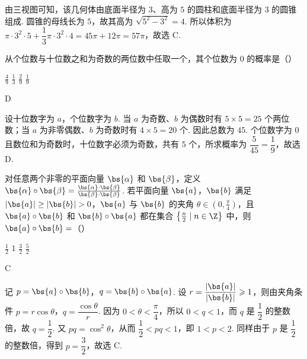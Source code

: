 \begin{solution}
由三视图可知，该几何体由底面半径为 \(3\)、高为 \(5\) 的圆柱和底面半径为 \(3\) 的圆锥组成. 圆锥的母线长为 \(5\)，故其高为 \(\sqrt{5^2-3^2}=4\). 所以体积为
\(\pi\cdot3^2\cdot5+\dfrac{1}{3}\pi\cdot3^2\cdot4=45\pi+12\pi=57\pi\)，故选 C.
\end{solution}

\begin{problem}
从个位数与十位数之和为奇数的两位数中任取一个，其个位数为 \(0\) 的概率是（\quad）

\choices
    {\(\frac{4}{9}\)}
    {\(\frac{1}{3}\)}
    {\(\frac{2}{9}\)}
    {\(\frac{1}{9}\)}
\end{problem}

\begin{answer}
D
\end{answer}

\begin{solution}
设十位数字为 \(a\)，个位数字为 \(b\). 当 \(a\) 为奇数、\(b\) 为偶数时有 \(5\times5=25\) 个两位数；当 \(a\) 为非零偶数、\(b\) 为奇数时有 \(4\times5=20\) 个. 因此总数为 \(45\). 个位数字为 \(0\) 且数位和为奇数时，十位数字必须为奇数，共有 \(5\) 个，所求概率为 \(\dfrac{5}{45}=\dfrac{1}{9}\)，故选 D.
\end{solution}

\begin{problem}
对任意两个非零的平面向量 \(\bs{\alpha}\) 和 \(\bs{\beta}\)，定义 \(\bs{\alpha} \circ \bs{\beta} = \frac{\bs{\alpha} \cdot \bs{\beta}}{\bs{\beta} \cdot \bs{\beta}}\). 若平面向量 \(\bs{a}\)，\(\bs{b}\) 满足 \(|\bs{a}| \ge |\bs{b}| > 0\)，\(\bs{a}\) 与 \(\bs{b}\) 的夹角 \(\theta \in \left( 0, \frac{\pi}{4} \right)\)，且 \(\bs{a} \circ \bs{b}\) 和 \(\bs{b} \circ \bs{a}\) 都在集合 \(\left\{ \frac{n}{2} \mid n \in \Z \right\}\) 中，则 \(\bs{a} \circ \bs{b} =\)（\quad）

\choices
    {\(\frac{1}{2}\)}
    {\(1\)}
    {\(\frac{3}{2}\)}
    {\(\frac{5}{2}\)}
\end{problem}

\begin{answer}
C
\end{answer}

\begin{solution}
记 \(p=\bs{a}\circ\bs{b}\)，\(q=\bs{b}\circ\bs{a}\). 设 \(r=\dfrac{|\bs{a}|}{|\bs{b}|}\geqslant1\)，则由夹角条件
\(p=r\cos\theta\)，\(q=\dfrac{\cos\theta}{r}\). 因为 \(0<\theta<\dfrac{\pi}{4}\)，所以 \(0<q<1\)，而 \(q\) 是 \(\dfrac{1}{2}\) 的整数倍，故 \(q=\dfrac{1}{2}\). 又 \(pq=\cos^2\theta\)，从而
\(\dfrac{1}{2}<pq<1\)，即 \(1<p<2\). 同样由于 \(p\) 是 \(\dfrac{1}{2}\) 的整数倍，得到 \(p=\dfrac{3}{2}\)，故选 C.
\end{solution}


